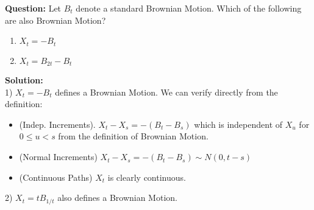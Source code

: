 \documentclass{article}
\begin{document}
\begin{tcolorbox}[colframe=black,colback=gray!5,boxrule=0.5pt]
\textbf{Question:} Let $B_t$ denote a standard Brownian Motion. Which of the following are also Brownian Motion? \cite{Fima}
\begin{enumerate}
    \item $X_t = -B_t$
    \item $X_t = B_{2t} - B_t$
\end{enumerate} 
\end{tcolorbox}

\textbf{Solution:}\\
1) $X_t = -B_t$ defines a Brownian Motion. We can verify directly from the definition: 
\begin{itemize}
    \item (Indep. Increments). $X_t - X_s = -(B_t - B_s)$ which is independent of $X_u$ for $0\leq u <s$ from the definition of Brownian Motion. 
    \item (Normal Increments) $X_t - X_s = -(B_t - B_s) \sim N(0, t-s)$
    \item (Continuous Paths) $X_t$ is clearly continuous.
\end{itemize}
2) $X_t = t B_{1/t}$ also defines a Brownian Motion.

\vspace{2mm}
\end{document}
